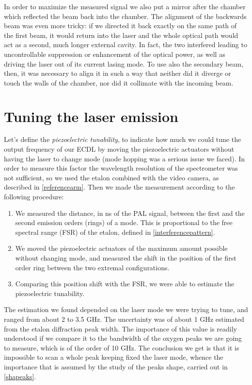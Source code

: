 \medskip
In order to maximize the measured signal we also put a mirror after the chamber which reflected the beam back into the chamber. The alignment of the backwards beam was even more tricky: if we directed it back exactly on the same path of the first beam, it would return into the laser and the whole optical path would act as a second, much longer external cavity. In fact, the two interfered leading to uncontrollable suppression or enhancement of the optical power, as well as driving the laser out of its current lasing mode. To use also the secondary beam, then, it was necessary to align it in such a way that neither did it diverge or touch the walls of the chamber, nor did it collimate with the incoming beam.

	\section{Tuning the laser emission}\label{tuna}
Let's define the \textit{piezoelectric tunability}, to indicate how much we could tune the output frequency of our ECDL by moving the piezoelectric actuators without having the laser to change mode (mode hopping was a serious issue we faced). In order to measure this factor the wavelength resolution of the spectrometer was not sufficient, so we used the etalon combined with the video camera, as described in \cref{referencearm}. Then we made the measurement according to the following procedure:
\begin{enumerate}
\item We measured the distance, in ns of the PAL signal, between the first and the second emission orders (rings) of a mode. This is proportional to the free spectral range (FSR) of the etalon, defined in \cref{interferencepattern}.
\item We moved the piezoelectric actuators of the maximum amount possible without changing mode, and measured the shift in the position of the first order ring between the two extremal configurations.
\item Comparing this position shift with the FSR, we were able to estimate the piezoelectric tunability.
\end{enumerate}
The estimation we found depended on the laser mode we were trying to tune, and ranged from about 2 to 3.5 GHz. The uncertainty was of about 1 GHz estimated from the etalon diffraction peak width. The importance of this value is readily understood if we compare it to the bandwidth of the oxygen peaks we are going to measure, which is of the order of 10 GHz. The conclusion we get is that it is impossible to scan a whole peak keeping fixed the laser mode, whence the importance that is assumed by the study of the peaks shape, carried out in \cref{shapeaks}.

